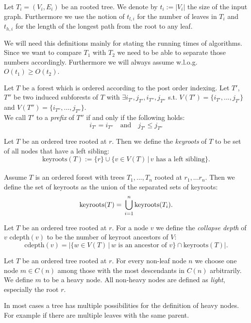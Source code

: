 \begin{defin} Let $T_i=(V_i,E_i)$ be an rooted tree. We denote by $t_i:= |V_i|$ the size of the input graph. Furthermore we use the notion of $t_{l,i}$ for the number of leaves in $T_i$ and $t_{h,i}$ for the length of the longest path from the root to any leaf. 
\end{defin}
\begin{rem}
We will need this definitions mainly for stating the running times of algorithms. Since we want to compare $T_1$ with $T_2$ we need to be able to separate those numbers accordingly. Furthermore we will always assume w.l.o.g. $O(t_1)\geq O(t_2)$.
\end{rem}
\begin{defin}
Let $T$ be a forest which is ordered according to the post order indexing. Let $T'$, $T''$ be two induced subforests of $T$ with $\exists i_{T'},j_{T'},i_{T''},j_{T''}$ s.t. $V(T')=\{i_{T'},...,j_{T'}\}$ and $V(T'')=\{i_{T''},...,j_{T''}\}$.\\
We call $T'$ to a \textit{prefix} of $T''$ if and only if the following holds:
$$i_{T'} = i_{T''} \quad \text{and} \quad j_{T'} \leq j_{T''}$$
\end{defin}
\begin{defin}
Let $T$ be an ordered tree rooted at $r$. Then we define the \textit{keyroots} of $T$ to be set of all nodes that have a left sibling:
$$\text{keyroots}(T) := \{r\} \cup \{v \in V(T) \,|\,v\text{ has a left sibling}\}.$$\\
Assume $T$ is an ordered forest with trees $T_1,...,T_n$ rooted at $r_1,...r_n$. Then we define the set of keyroots as the union of the separated sets of keyroots:
$$\text{keyroots}(T) = \sideset{}{}\bigcup_{i=1}^n \text{keyroots}(T_i).$$
\end{defin}
\begin{defin}
Let $T$ be an ordered tree rooted at $r$. For a node $v$ we define the \textit{collapse depth} of $v$ cdepth$(v)$ to be the number of keyroot ancestors of $V$:
$$\text{cdepth}(v) = |\{w \in V(T)\,|\, w \text{ is an ancestor of }v\} \cap \text{keyroots}(T)|.$$
\end{defin}
\begin{defin}
Let $T$ be an ordered tree rooted at $r$. For every non-leaf node $n$ we choose one node $m \in C(n)$ among those with the most descendants in $C(n)$ arbitrarily. We define $m$ to be a heavy node. All non-heavy nodes are defined as \textit{light}, especially the root $r$. 
\end{defin}
\begin{rem}
In most cases a tree has multiple possibilities for the definition of heavy nodes. For example if there are multiple leaves with the same parent.
\end{rem}

